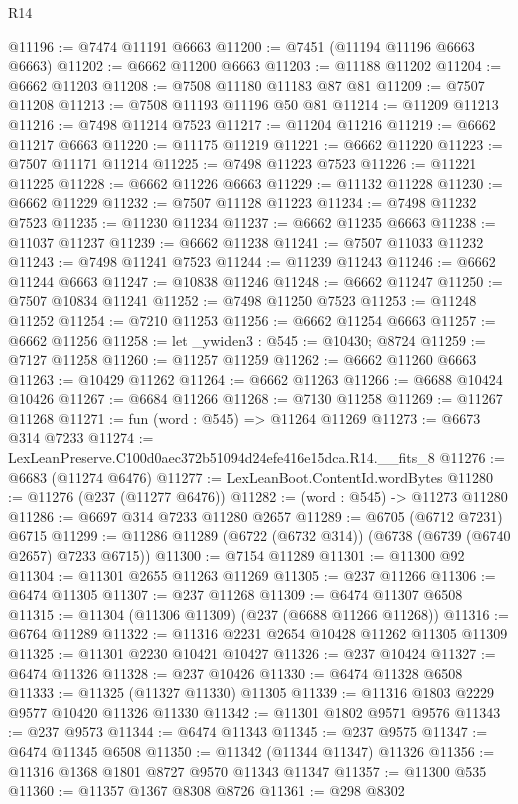 \begin{lexlean}{R14}
\begin{coremodule}
@11196 := @7474 @11191 @6663
@11200 := @7451 (@11194 @11196 @6663 @6663)
@11202 := @6662 @11200 @6663
@11203 := @11188 @11202
@11204 := @6662 @11203
@11208 := @7508 @11180 @11183 @87 @81
@11209 := @7507 @11208
@11213 := @7508 @11193 @11196 @50 @81
@11214 := @11209 @11213
@11216 := @7498 @11214 @7523
@11217 := @11204 @11216
@11219 := @6662 @11217 @6663
@11220 := @11175 @11219
@11221 := @6662 @11220
@11223 := @7507 @11171 @11214
@11225 := @7498 @11223 @7523
@11226 := @11221 @11225
@11228 := @6662 @11226 @6663
@11229 := @11132 @11228
@11230 := @6662 @11229
@11232 := @7507 @11128 @11223
@11234 := @7498 @11232 @7523
@11235 := @11230 @11234
@11237 := @6662 @11235 @6663
@11238 := @11037 @11237
@11239 := @6662 @11238
@11241 := @7507 @11033 @11232
@11243 := @7498 @11241 @7523
@11244 := @11239 @11243
@11246 := @6662 @11244 @6663
@11247 := @10838 @11246
@11248 := @6662 @11247
@11250 := @7507 @10834 @11241
@11252 := @7498 @11250 @7523
@11253 := @11248 @11252
@11254 := @7210 @11253
@11256 := @6662 @11254 @6663
@11257 := @6662 @11256
@11258 := let _ywiden3 : @545 := @10430; @8724
@11259 := @7127 @11258
@11260 := @11257 @11259
@11262 := @6662 @11260 @6663
@11263 := @10429 @11262
@11264 := @6662 @11263
@11266 := @6688 @10424 @10426
@11267 := @6684 @11266
@11268 := @7130 @11258
@11269 := @11267 @11268
@11271 := fun (word : @545) => @11264 @11269
@11273 := @6673 @314 @7233
@11274 := LexLeanPreserve.C100d0aec372b51094d24efe416e15dca.R14.__fits_8
@11276 := @6683 (@11274 @6476)
@11277 := LexLeanBoot.ContentId.wordBytes
@11280 := @11276 (@237 (@11277 @6476))
@11282 := (word : @545) -> @11273 @11280
@11286 := @6697 @314 @7233 @11280 @2657
@11289 := @6705 (@6712 @7231) @6715
@11299 := @11286 @11289 (@6722 (@6732 @314)) (@6738 (@6739 (@6740 @2657) @7233 @6715))
@11300 := @7154 @11289
@11301 := @11300 @92
@11304 := @11301 @2655 @11263 @11269
@11305 := @237 @11266
@11306 := @6474 @11305
@11307 := @237 @11268
@11309 := @6474 @11307 @6508
@11315 := @11304 (@11306 @11309) (@237 (@6688 @11266 @11268))
@11316 := @6764 @11289
@11322 := @11316 @2231 @2654 @10428 @11262 @11305 @11309
@11325 := @11301 @2230 @10421 @10427
@11326 := @237 @10424
@11327 := @6474 @11326
@11328 := @237 @10426
@11330 := @6474 @11328 @6508
@11333 := @11325 (@11327 @11330) @11305
@11339 := @11316 @1803 @2229 @9577 @10420 @11326 @11330
@11342 := @11301 @1802 @9571 @9576
@11343 := @237 @9573
@11344 := @6474 @11343
@11345 := @237 @9575
@11347 := @6474 @11345 @6508
@11350 := @11342 (@11344 @11347) @11326
@11356 := @11316 @1368 @1801 @8727 @9570 @11343 @11347
@11357 := @11300 @535
@11360 := @11357 @1367 @8308 @8726
@11361 := @298 @8302

\end{coremodule}
\end{lexlean}
